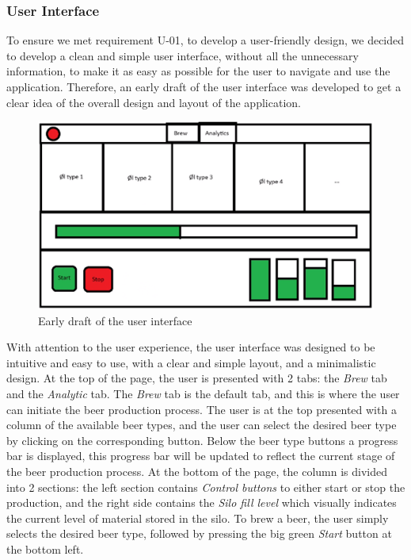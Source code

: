 \subsubsection{User Interface}
To ensure we met requirement U-01, to develop a user-friendly design, we decided to develop a clean and simple user interface, without all the unnecessary information, to make it as easy as possible for the user to navigate and use the application. \newline
Therefore, an early draft of the user interface was developed to get a clear idea of the overall design and layout of the application. \newline
\begin{center}
  \centering
  \begin{figure}[H]
      \includegraphics[width=1\textwidth]{img/frontend-draft.png}
      \caption{Early draft of the user interface}
      \label{fig:Frontend_draft}
  \end{figure}
\end{center}
With attention to the user experience, the user interface was designed to be intuitive and easy to use, with a clear and simple layout, and a minimalistic design. \newline
At the top of the page, the user is presented with 2 tabs: the \textit{Brew} tab and the \textit{Analytic} tab.  \newline
The \textit{Brew} tab is the default tab, and this is where the user can initiate the beer production process. \newline
The user is at the top presented with a column of the available beer types, and the user can select the desired beer type by clicking on the corresponding button. \newline
Below the beer type buttons a progress bar is displayed, this progress bar will be updated to reflect the current stage of the beer production process. \newline
At the bottom of the page, the column is divided into 2 sections: the left section contains \textit{Control buttons} to either start or stop the production, and the right side contains the \textit{Silo fill level} which visually indicates the current level of material stored in the silo. \newline
To brew a beer, the user simply selects the desired beer type, followed by pressing the big green \textit{Start} button at the bottom left.

